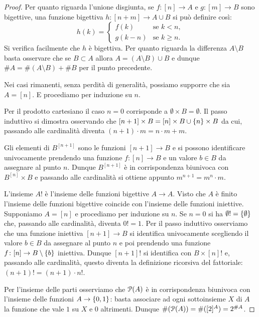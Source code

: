 \begin{proof}
Per quanto riguarda l'unione disgiunta, se $f\colon [n]\to A$ e $g\colon [m]\to B$
sono bigettive, una funzione bigettiva $h\colon [n+m] \to A\cup B$ si può
definire così:
\[
  h(k) = \begin{cases}
    f(k) & \text{se } k<n,\\
    g(k-n) & \text{se } k\ge n.
  \end{cases}
\] 
Si verifica facilmente che $h$ è bigettiva.
Per quanto riguarda la differenza $A\setminus B$ basta osservare che se $B\subset A$
allora $A = (A\setminus B) \cup B$ e dunque $\#A = \#(A\setminus B) + \#B$ per il punto precedente.

Nei casi rimanenti, senza perdità di generalità, 
possiamo supporre che sia $A=[n]$. E procediamo per induzione su $n$.

Per il prodotto cartesiano il caso $n=0$ corrisponde a $\emptyset\times B = \emptyset$.
Il passo induttivo si dimostra osservando che $[n+1]\times B = [n]\times B \cup \ENCLOSE{n} \times B$
da cui, passando alle cardinalità diventa $(n+1)\cdot m = n\cdot m + m$.

Gli elementi di $B^{[n+1]}$ sono le funzioni $[n+1]\to B$ 
e si possono identificare
univocamente prendendo una funzione $f\colon [n]\to B$ e un valore $b\in B$ da assegnare 
al punto $n$. 
Dunque $B^{[n+1]}$ è in corrispondenza biunivoca con $B^{[n]}\times B$
e passando alle cardinalità si ottiene appunto $m^{n+1} = m^n\cdot m$.

L'insieme $A!$ è l'insieme delle funzioni bigettive $A\to A$. 
Visto che $A$ è finito l'insieme delle funzioni bigettive coincide 
con l'insieme delle funzioni iniettive. 
Supponiamo $A=[n]$ e procediamo per induzione su $n$.
Se $n=0$ si ha $\emptyset!=\ENCLOSE{\emptyset}$ che, passando alle cardinalità, diventa $0!=1$.
Per il passo induttivo osserviamo che una funzione iniettiva $[n+1]\to B$ 
si identifica univocamente scegliendo il valore $b\in B$ da assegnare al punto $n$ 
e poi prendendo una funzione $f\colon [n]\to B\setminus\ENCLOSE{b}$ iniettiva. 
Dunque $[n+1]!$ si identifica con $B\times [n]!$ e, passando alle cardinalità, questo diventa 
la definizione ricorsiva del fattoriale: $(n+1)! = (n+1)\cdot n!$.

Per l'insieme delle parti osserviamo che $\P(A)$ è in corrispondenza biunivoca con
l'insieme delle funzioni $A\to \ENCLOSE{0,1}$: basta associare ad ogni sottoinsieme $X$ di $A$ 
la funzione che vale $1$ su $X$ e $0$ altrimenti. 
Dunque $\#(\P(A)) = \#([2]^A) = 2^{\#A}$.


\end{proof}
